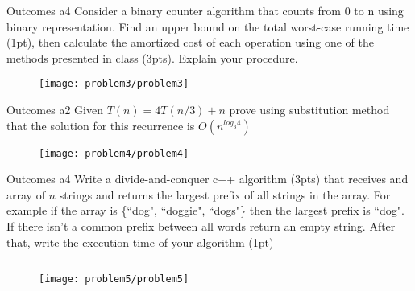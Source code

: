 \begin{problem}{Outcomes a}{4}
    Consider a binary counter algorithm that counts from 0 to n using binary representation. Find an upper bound on the total worst-case running time (1pt), then calculate the amortized cost of each operation using one of the methods presented in class (3pts). Explain your procedure.

    \begin{figure}[H]
        \centering
        \texttt{[image: problem3/problem3]}
    \end{figure}
\end{problem}

\begin{problem}{Outcomes a}{2}
    Given $T(n) = 4T(n/3) + n$ prove using substitution method that the solution for this recurrence is $O(n^{log_3 4})$

    \begin{figure}[H]
        \centering
        \texttt{[image: problem4/problem4]}
    \end{figure}
\end{problem}

\begin{problem}{Outcomes a}{4}
    Write a divide-and-conquer c++ algorithm (3pts) that receives and array of $n$ strings and returns the largest prefix of all strings in the array. For example if the array is \{``dog", ``doggie", ``dogs"\} then the largest prefix is ``dog". If there isn't a common prefix between all words return an empty string. After that, write the execution time of your algorithm (1pt)

    \inputminted[fontsize=\small,breaklines]{cpp}{answers/problem5/problem5.cpp}
 \begin{figure}[H]
        \centering
        \texttt{[image: problem5/problem5]}
    \end{figure}

\end{problem}


